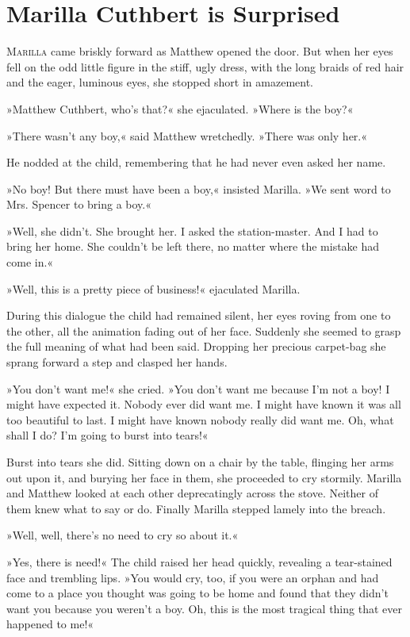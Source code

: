 \chapter{Marilla Cuthbert is Surprised}

\lettrine[lines=4]{M}{arilla} came briskly forward as Matthew opened the door. But when her eyes fell on the odd little figure in the stiff, ugly dress, with the long braids of red hair and the eager, luminous eyes, she stopped short in amazement.

»Matthew Cuthbert, who's that?« she ejaculated. »Where is the boy?«

»There wasn't any boy,« said Matthew wretchedly. »There was only her.«

He nodded at the child, remembering that he had never even asked her name.

»No boy! But there must have been a boy,« insisted Marilla. »We sent word to Mrs. Spencer to bring a boy.«

»Well, she didn't. She brought her. I asked the station-master. And I had to bring her home. She couldn't be left there, no matter where the mistake had come in.«

»Well, this is a pretty piece of business!« ejaculated Marilla.

During this dialogue the child had remained silent, her eyes roving from one to the other, all the animation fading out of her face. Suddenly she seemed to grasp the full meaning of what had been said. Dropping her precious carpet-bag she sprang forward a step and clasped her hands.

»You don't want me!« she cried. »You don't want me because I'm not a boy! I might have expected it. Nobody ever did want me. I might have known it was all too beautiful to last. I might have known nobody really did want me. Oh, what shall I do? I'm going to burst into tears!«

Burst into tears she did. Sitting down on a chair by the table, flinging her arms out upon it, and burying her face in them, she proceeded to cry stormily. Marilla and Matthew looked at each other deprecatingly across the stove. Neither of them knew what to say or do. Finally Marilla stepped lamely into the breach.

»Well, well, there's no need to cry so about it.«

»Yes, there is need!« The child raised her head quickly, revealing a tear-stained face and trembling lips. »You would cry, too, if you were an orphan and had come to a place you thought was going to be home and found that they didn't want you because you weren't a boy. Oh, this is the most tragical thing that ever happened to me!«

